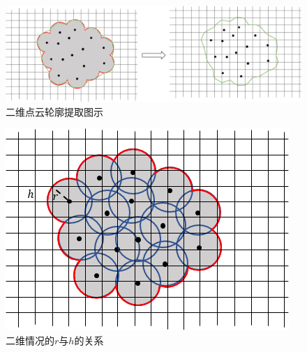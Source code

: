 \begin{figure}[htbp]
    \centering
    \includegraphics[scale=0.3]{./images/image7.png}
    \caption{二维点云轮廓提取图示}
    \label{fig:2D marching cubes}
\end{figure}
\begin{figure}[htbp]
    \centering
    \includegraphics[scale=1.0]{./images/image5.png}
    \caption{二维情况的$r$与$h$的关系}
    \label{fig:grid and sphere}
\end{figure}

